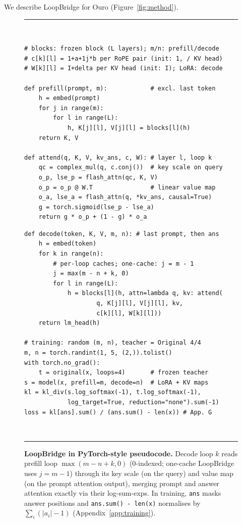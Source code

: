 \documentclass[11pt]{article}
\begin{document}
We describe LoopBridge for Ouro (Figure~\ref{fig:method}).

\begin{figure}[t]
\centering
\rule{\textwidth}{0.4pt}\\[-2pt]
\begin{minipage}[t]{0.495\textwidth}
\begin{lstlisting}
# blocks: frozen block (L layers); m/n: prefill/decode
# c[k][l] = 1+a+1j*b per RoPE pair (init: 1, / KV head)
# W[k][l] = I+delta per KV head (init: I); LoRA: decode

def prefill(prompt, m):            # excl. last token
    h = embed(prompt)
    for j in range(m):
        for l in range(L):
            h, K[j][l], V[j][l] = blocks[l](h)
    return K, V

def attend(q, K, V, kv_ans, c, W): # layer l, loop k
    qc = complex_mul(q, c.conj())  # key scale on query
    o_p, lse_p = flash_attn(qc, K, V)
    o_p = o_p @ W.T                # linear value map
    o_a, lse_a = flash_attn(q, *kv_ans, causal=True)
    g = torch.sigmoid(lse_p - lse_a)
    return g * o_p + (1 - g) * o_a
\end{lstlisting}
\end{minipage}\hfill
\begin{minipage}[t]{0.485\textwidth}
\begin{lstlisting}
def decode(token, K, V, m, n): # last prompt, then ans
    h = embed(token)
    for k in range(n):
        # per-loop caches; one-cache: j = m - 1
        j = max(m - n + k, 0)
        for l in range(L):
            h = blocks[l](h, attn=lambda q, kv: attend(
                    q, K[j][l], V[j][l], kv,
                    c[k][l], W[k][l]))
    return lm_head(h)

# training: random (m, n), teacher = Original 4/4
m, n = torch.randint(1, 5, (2,)).tolist()
with torch.no_grad():
    t = original(x, loops=4)       # frozen teacher
s = model(x, prefill=m, decode=n)  # LoRA + KV maps
kl = kl_div(s.log_softmax(-1), t.log_softmax(-1),
            log_target=True, reduction="none").sum(-1)
loss = kl[ans].sum() / (ans.sum() - len(x)) # App. G
\end{lstlisting}
\end{minipage}\\[-1pt]
\rule{\textwidth}{0.4pt}
\caption{\textbf{LoopBridge in PyTorch-style pseudocode.} Decode loop $k$ reads prefill loop $\max(m-n+k,0)$ (0-indexed;
one-cache LoopBridge uses $j=m-1$) through its key scale (on the query) and value map (on the prompt attention output),
merging prompt and answer attention exactly via their log-sum-exps. In training, \texttt{ans} masks answer positions and
\texttt{ans.sum() - len(x)} normalises by $\sum_i(|a_i|-1)$ (Appendix~\ref{app:training}).}
\label{alg:loopbridge}
\end{figure}
\end{document}
